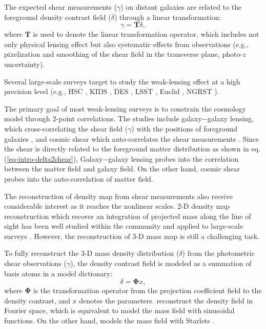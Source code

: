 \documentclass[twocolumn]{aastex62}
\begin{document}
The expected shear measurements ($\gamma$) on distant galaxies are related to
the foreground density contrast field ($\delta$) through a linear
transformation: \begin{equation} \label{eq-intro-delta2shear} \gamma=\mathbf{T}
\delta, \end{equation} where $\mathbf{T}$ is used to denote the linear
transformation operator, which includes not only physical lensing effect but
also systematic effects from observations (e.g., pixelization and smoothing of
the shear field in the transverse plane, photo-$z$ uncertainty).

Several large-scale surveys target to study the weak-lensing effect at a high
precision level (e.g., HSC \citep{HSC1-data}, KIDS \citep{KIDS13}, DES
\citep{DES05}, LSST \citep{LSSTScienceBook}, Euclid \citep{Euclid2011}, NGRST
\citep{WFIRST15}).

The primary goal of most weak-lensing surveys is to constrain the cosmology
model through $2$-point correlations. The studies include galaxy$-$galaxy
lensing, which cross-correlating the shear field ($\gamma$) with the positions
of foreground galaxies
\citep{gglens-GAMA-Han2014,gglens-BossCFHTMore2015,gglens-DES1}, and cosmic
shear which auto-correlates the shear measurements
\citep{cosmicShearRealKids450,cosmicShear-DES1,cosmicShear_HSC1_Chiaki2019,cosmicShear_HSC1_Hamana2019}.
Since the shear is directly related to the foreground matter distribution as
shown in eq.  (\ref{eq-intro-delta2shear}), Galaxy$-$galaxy lensing probes into
the correlation between the matter field and galaxy field. On the other hand,
cosmic shear probes into the auto-correlation of matter field.

The reconstruction of density map from shear measurements also receive
considerable interest as it reaches the nonlinear scales.  $2$-D density map
reconstruction which recover an integration of projected mass along the line of
sight has been well studied within the community
\citep{massMap-KS1993,WL-massMap-Glimpse2D-Lanusse2016,sparseBaysianMassMap-Price2020}
and applied to large-scale surveys
\citep{HSC1-massMaps,massMapDES-Chang2018,DES-SV-massMap-sparsity}. However,
the reconstruction of $3$-D mass map is still a challenging task.

To fully reconstruct the $3$-D mass density distribution ($\delta$) from the
photometric shear observations ($\gamma$), the density contrast field is
modeled as a summation of basis atoms in a model dictionary:
\begin{equation} \label{eq-intro-dict}
 \delta= \mathbf{\Phi} x,
\end{equation}
where $\mathbf{\Phi}$ is the transformation operator from the projection
coefficient field to the density contrast, and $x$ denotes the parameters.
\citet{LSS-massMap-Wiener-Simon2009} reconstruct the density field in Fourier
space, which is equivalent to model the mass field with sinusoidal functions.
On the other hand, \citet{LSS-massMap-Glimpse3D-Leonard2014} models the mass
field with Starlets \citep{Starlet-Starck2015}.
\end{document}
